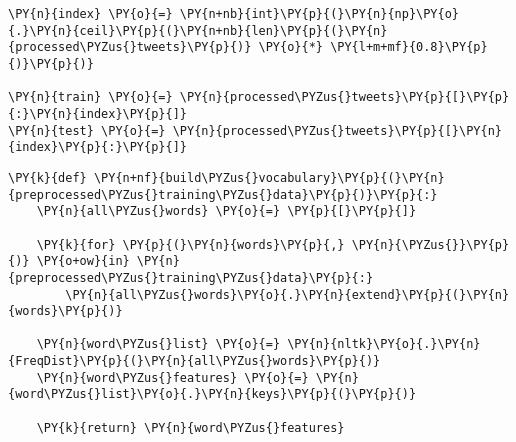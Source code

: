 \documentclass[11pt]{article}
\begin{document}
    \begin{tcolorbox}[breakable, size=fbox, boxrule=1pt, pad at break*=1mm,colback=cellbackground, colframe=cellborder]
\begin{Verbatim}[commandchars=\\\{\}]
\PY{n}{index} \PY{o}{=} \PY{n+nb}{int}\PY{p}{(}\PY{n}{np}\PY{o}{.}\PY{n}{ceil}\PY{p}{(}\PY{n+nb}{len}\PY{p}{(}\PY{n}{processed\PYZus{}tweets}\PY{p}{)} \PY{o}{*} \PY{l+m+mf}{0.8}\PY{p}{)}\PY{p}{)}

\PY{n}{train} \PY{o}{=} \PY{n}{processed\PYZus{}tweets}\PY{p}{[}\PY{p}{:}\PY{n}{index}\PY{p}{]}
\PY{n}{test} \PY{o}{=} \PY{n}{processed\PYZus{}tweets}\PY{p}{[}\PY{n}{index}\PY{p}{:}\PY{p}{]}
\end{Verbatim}
\end{tcolorbox}

    \begin{tcolorbox}[breakable, size=fbox, boxrule=1pt, pad at break*=1mm,colback=cellbackground, colframe=cellborder]
\begin{Verbatim}[commandchars=\\\{\}]
\PY{k}{def} \PY{n+nf}{build\PYZus{}vocabulary}\PY{p}{(}\PY{n}{preprocessed\PYZus{}training\PYZus{}data}\PY{p}{)}\PY{p}{:}
    \PY{n}{all\PYZus{}words} \PY{o}{=} \PY{p}{[}\PY{p}{]}

    \PY{k}{for} \PY{p}{(}\PY{n}{words}\PY{p}{,} \PY{n}{\PYZus{}}\PY{p}{)} \PY{o+ow}{in} \PY{n}{preprocessed\PYZus{}training\PYZus{}data}\PY{p}{:}
        \PY{n}{all\PYZus{}words}\PY{o}{.}\PY{n}{extend}\PY{p}{(}\PY{n}{words}\PY{p}{)}

    \PY{n}{word\PYZus{}list} \PY{o}{=} \PY{n}{nltk}\PY{o}{.}\PY{n}{FreqDist}\PY{p}{(}\PY{n}{all\PYZus{}words}\PY{p}{)}
    \PY{n}{word\PYZus{}features} \PY{o}{=} \PY{n}{word\PYZus{}list}\PY{o}{.}\PY{n}{keys}\PY{p}{(}\PY{p}{)}

    \PY{k}{return} \PY{n}{word\PYZus{}features}
\end{Verbatim}
\end{tcolorbox}
\end{document}
